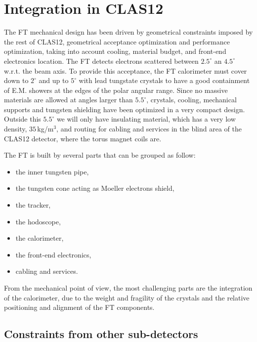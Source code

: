\section{Integration in CLAS12}\label{sec:integration}
The FT mechanical design  has been driven by geometrical constraints imposed by the rest of CLAS12, geometrical acceptance optimization and performance optimization, taking into account cooling, material budget, and front-end electronics location.
The FT detects electrons scattered between $2.5^\circ$ an $4.5^\circ$ w.r.t. the beam axis. To provide this acceptance, the FT calorimeter must cover down to $2^\circ$ and up to $5^\circ$ with lead tungstate crystals to have a good containment of E.M. showers at the edges of the polar angular range. Since no massive materials are allowed at angles larger than $5.5^\circ$, crystals, cooling, mechanical supports and tungsten shielding have been optimized in a very compact design. Outside this $5.5^\circ$ we will only have insulating material, which has a very low density, $35\,$kg/m$^3$, and routing for cabling and services in the blind area of the CLAS12 detector, where the torus magnet coils are.

The FT is built by several parts that can be grouped as follow:

\begin{itemize}
\item{the inner tungsten pipe,}
\item{the tungsten cone acting as Moeller electrons shield,}
\item{the tracker,}
\item{the hodoscope,}
\item{the calorimeter,}
\item{the front-end electronics,}
\item{cabling and services.}
\end{itemize}

From the mechanical point of view, the most challenging parts are the integration of the calorimeter, due to the weight and fragility of the crystals and the relative positioning and alignment of the FT components.


\subsection{Constraints from other sub-detectors}

